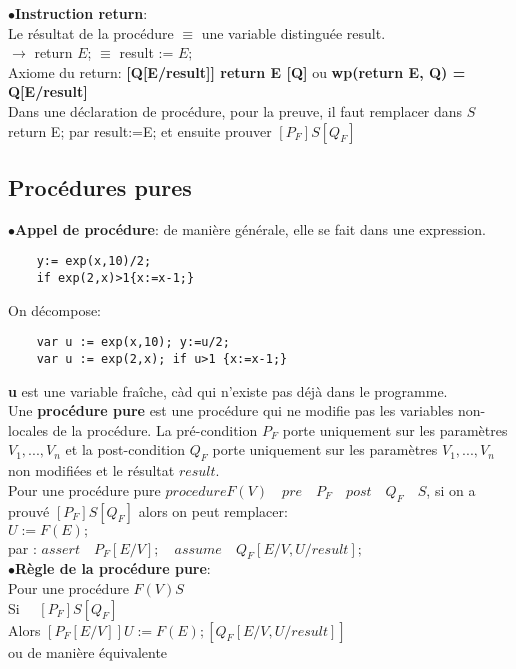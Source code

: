 $\bullet$\textbf{Instruction return}: \\Le résultat de la procédure $\equiv$ une variable distinguée result.\\
$\rightarrow$ return $E$; $\equiv$ result := $E;$\\
Axiome du return: \textbf{[Q[E/result]] return E [Q]} ou \textbf{wp(return E, Q) = Q[E/result]}
\\

Dans une déclaration de procédure, pour la preuve, il faut remplacer dans $S$ return E; par result:=E; et ensuite prouver $[P_F]S[Q_F]$
\subsection{Procédures pures}
$\bullet$\textbf{Appel de procédure}: de manière générale, elle se fait dans une expression.
\begin{lstlisting}
    y:= exp(x,10)/2;
    if exp(2,x)>1{x:=x-1;}
\end{lstlisting}
On décompose:
\begin{lstlisting}
    var u := exp(x,10); y:=u/2;
    var u := exp(2,x); if u>1 {x:=x-1;}
\end{lstlisting}
\textbf{u} est une variable fraîche, càd qui n'existe pas déjà dans le programme.\\

Une\textbf{ procédure pure} est une procédure qui ne modifie pas les variables non-locales de la procédure. La pré-condition $P_F$ porte uniquement sur les paramètres $V_1,...,V_n$ et la post-condition $Q_F$ porte uniquement sur les paramètres  $V_1,...,V_n$ non modifiées et le résultat $result$.\\

Pour une procédure pure $procedure F(V) \quad pre \quad P_F \quad post \quad Q_F \quad {S}$, si on a prouvé $[P_F] S [Q_F]$ alors on peut remplacer:\\
$U:=F(E);$\\
par : $assert \quad P_F[E/V]; \quad assume \quad Q_F[E/V,U/result];$\\

$\bullet$\textbf{Règle de la procédure pure}:\\

Pour une procédure $F(V) {S}$\\
Si $\quad  [P_F]S[Q_F]$\\
Alors $[P_F[E/V]]U:=F(E);[Q_F[E/V,U/result]]$\\

ou de manière équivalente\\


